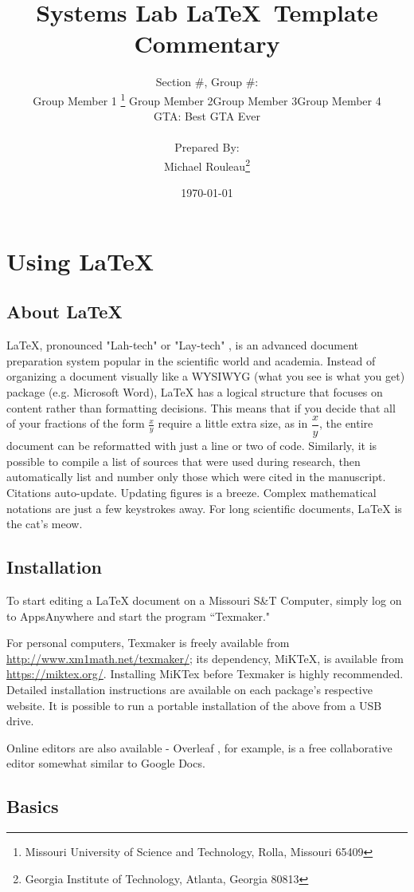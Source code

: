 \documentclass[11pt,letter]{report}
\title{\Huge{Systems Lab \LaTeX\ Template Commentary}}
\author{Section \#, Group \#: \\
	Group Member 1 \footnote{Missouri University of Science and Technology, Rolla, Missouri 65409} 
	\quad Group Member 2\footnotemark[1]
	\quad Group Member 3\footnotemark[1]
	\quad Group Member 4\footnotemark[1] 
	\\ GTA: Best GTA Ever\footnotemark[1] \\ \\ 
	Prepared By: \\ Michael Rouleau\footnote{Georgia Institute of Technology, Atlanta, Georgia 80813}
}
\date{\today}
\begin{document}
	\maketitle
	
	\chapter{Using \LaTeX{}} \label{chap:usinglatex}
	\section{About \LaTeX{}}
	\LaTeX{}, pronounced "Lah-tech" or "Lay-tech" \cite{Lamport}, is an advanced document preparation system popular in the scientific world and academia. Instead of organizing a document visually like a WYSIWYG (what you see is what you get) package (e.g. Microsoft Word), \LaTeX{} has a logical structure that focuses on content rather than formatting decisions. This means that if you decide that all of your fractions of the form $\tfrac{x}{y}$ require a little extra size, as in $\dfrac{x}{y}$, the entire document can be reformatted with just a line or two of code. Similarly, it is possible to compile a list of sources that were used during research, then automatically list and number only those which were cited in the manuscript. Citations auto-update. Updating figures is a breeze. Complex mathematical notations are just a few keystrokes away. For long scientific documents, \LaTeX{} is the cat's meow.
	
	\section{Installation} \label{sect:install}
	To start editing a \LaTeX{} document on a Missouri S\&T Computer, simply log on to AppsAnywhere and start the program ``Texmaker."
	
	For personal computers, Texmaker is freely available from \url{http://www.xm1math.net/texmaker/}; its dependency, MiKTeX, is available from \url{https://miktex.org/}. Installing MiKTex before Texmaker is highly recommended. Detailed installation instructions are available on each package's respective website. It is possible to run a portable installation of the above from a USB drive.
	
	Online editors are also available  - Overleaf \cite{Overleaf}, for example, is a free collaborative editor somewhat similar to Google Docs.
	
	\section{Basics} \label{sect:basics}
\end{document}
